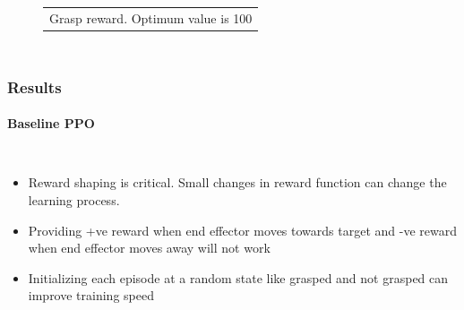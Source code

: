\documentclass{beamer}
\begin{document}
\begin{frame}
\begin{columns}[c]
\begin{figure}
\begin{tabular}{c}
					{\small Grasp reward. Optimum value is 100} \\
				\end{tabular}
			\end{figure}
		\end{columns}
	\end{frame}

	\begin{frame}
		\frametitle{Results}
		\framesubtitle{Baseline PPO}
		\vspace{-1em}
		\begin{columns}[c]
			\begin{itemize}
				\item Reward shaping is critical. Small changes in reward function can change the learning process.
				\item Providing +ve reward when end effector moves towards target and -ve reward when end effector moves away will not work
				\item Initializing each episode at a random state like grasped and not grasped can improve training speed
			\end{itemize}
			

\end{columns}
\end{frame}
\end{document}
